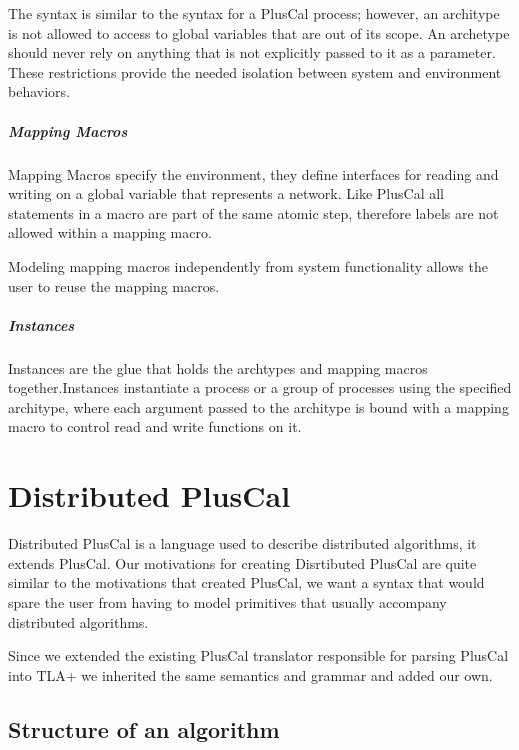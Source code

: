 \documentclass{thesul}
\begin{document}
The syntax is similar to the syntax for a PlusCal process; however, an architype is not allowed to access to global variables that are out of its scope. An archetype should never rely on anything that is not explicitly passed to it as a parameter. These restrictions provide the needed isolation between system and environment behaviors.

\paragraph{Mapping Macros}

Mapping Macros specify the environment, they define interfaces for reading and writing on a global variable that represents a network. Like PlusCal all statements in a macro are part of the same atomic step, therefore labels are not allowed within a mapping macro.

Modeling mapping macros independently from system functionality allows the user to reuse the mapping macros.

\paragraph{Instances}

Instances are the glue that holds the archtypes and mapping macros together.Instances instantiate a process or a group of processes using the specified architype, where each argument passed to the architype is bound with a mapping macro to control read and write functions on it.


\chapter{Distributed PlusCal}

Distributed PlusCal is a language used to describe distributed algorithms, it extends PlusCal. 
Our motivations for creating Disrtibuted PlusCal are quite similar to the motivations that created PlusCal, we want a syntax that would spare the user from having to model primitives that usually accompany distributed algorithms.

Since we extended the existing PlusCal translator responsible for parsing PlusCal into TLA+ we inherited the same semantics and grammar and added our own.

\section{Structure of an algorithm}
\end{document}
